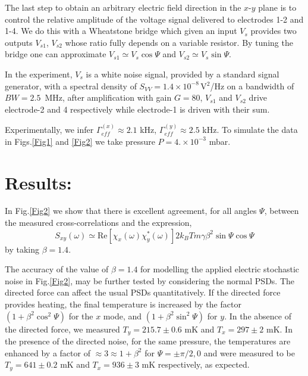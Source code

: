 \documentclass[twocolumn,english,notitlepage,superscriptaddress,nofootinbib]{revtex4-2}
\begin{document}
The last step to obtain an arbitrary electric field direction in the $x$-$y$ plane is to control the relative amplitude of the voltage signal delivered to electrodes 1-2 and 1-4. We do this with a Wheatstone bridge which given an input $V_s$ provides two outputs $V_{s1}$, $V_{s2}$ whose ratio fully depends on a variable resistor.  By tuning the bridge one can approximate $V_{s1}\simeq V_s \cos \Psi$ and $V_{s2}\simeq V_s \sin \Psi$.

In the experiment, $V_s$ is a white noise signal, provided by a standard signal generator, with a spectral density of $S_{VV}=1.4\times10^{-8}$\,V$^2$/Hz on a bandwidth of $BW=2.5$\, MHz, after amplification with gain $G=80$, $V_{s1}$ and $V_{s2}$ drive electrode-2 and 4 respectively while electrode-1 is driven with their sum.


Experimentally,  we infer $\Gamma_{eff}^{(x)} \approx 2.1$ kHz,  $\Gamma_{eff}^{(y)} \approx 2.5$ kHz.  To simulate the data in  Figs.\ref{Fig1} and \ref{Fig2} we take pressure  $P= 4. \times 10^{-3}$ mbar.

  
\section{Results:} 

In Fig.\ref{Fig2} we show that there is excellent  agreement,  for all angles $\Psi$,  between the measured cross-correlations and the expression,
\begin{equation}
 S_{xy}(\omega)\simeq \text{Re}[\chi_x(\omega)\chi_y^*(\omega)] 2k_BTm \gamma \beta^2 \sin \Psi \cos \Psi
 \label{SxyAn}
 \end{equation}
by taking $\beta=1.4$. 


The accuracy of the  value of $\beta=1.4$ for modelling the applied electric stochastic noise in Fig.\ref{Fig2},  may be further tested by considering the normal PSDs.
 The directed force can affect the usual PSDs quantitatively.  If the directed force provides heating,  the final temperature is increased by the factor $(1+\beta^2 \cos^2 \Psi)$ for the $x$ mode,  and $(1+\beta^2 \sin^2 \Psi)$
 for $y$.  In the absence of the directed force,  we measured $T_y=215.7 \pm 0.6$ mK and $T_x=297 \pm 2$ mK.
 In the presence of the directed noise,  for the same pressure,  the temperatures are enhanced by a factor of $\approx 3 \approx 1+\beta^2$ for $\Psi =\pm \pi/2,0$ and were measured to be $T_y=641 \pm 0.2$ mK and $T_x=936 \pm 3$ mK
 respectively,  as expected.
\end{document}
